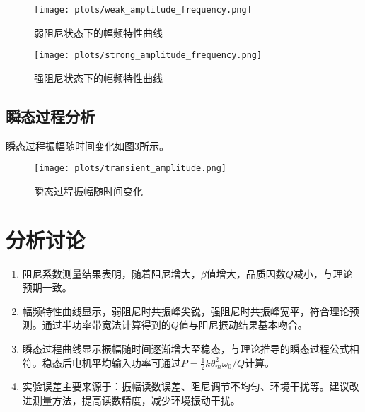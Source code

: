 \documentclass[UTF8]{ctexart}
\begin{document}
\begin{figure}[H]
    \centering
    \texttt{[image: plots/weak\_amplitude\_frequency.png]}
    \caption{弱阻尼状态下的幅频特性曲线}
    \label{fig:weak_amp_freq}
\end{figure}

\begin{figure}[H]
    \centering
    \texttt{[image: plots/strong\_amplitude\_frequency.png]}
    \caption{强阻尼状态下的幅频特性曲线}
    \label{fig:strong_amp_freq}
\end{figure}

\subsection{瞬态过程分析}
瞬态过程振幅随时间变化如图\ref{fig:transient}所示。

\begin{figure}[H]
    \centering
    \texttt{[image: plots/transient\_amplitude.png]}
    \caption{瞬态过程振幅随时间变化}
    \label{fig:transient}
\end{figure}

\section{分析讨论}
\begin{enumerate}
    \item 阻尼系数测量结果表明，随着阻尼增大，$\beta$值增大，品质因数$Q$减小，与理论预期一致。
    
    \item 幅频特性曲线显示，弱阻尼时共振峰尖锐，强阻尼时共振峰宽平，符合理论预测。通过半功率带宽法计算得到的$Q$值与阻尼振动结果基本吻合。
    
    \item 瞬态过程曲线显示振幅随时间逐渐增大至稳态，与理论推导的瞬态过程公式相符。稳态后电机平均输入功率可通过$P = \frac{1}{2}k\theta_m^2\omega_0/Q$计算。
    
    \item 实验误差主要来源于：振幅读数误差、阻尼调节不均匀、环境干扰等。建议改进测量方法，提高读数精度，减少环境振动干扰。
\end{enumerate}
\end{document}
